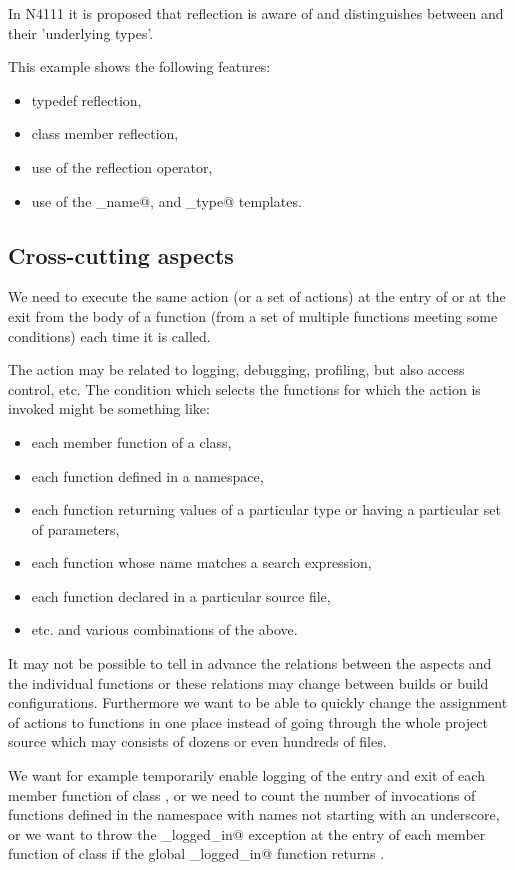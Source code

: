 In N4111 it is proposed that reflection is aware of \verb@typedef@s and distinguishes between
\verb@typedef@s and their 'underlying types'.

This example shows the following features:

\begin{itemize}
\item{typedef reflection,}
\item{class member reflection,}
\item{use of the reflection operator,}
\item{use of the \verb@base_name@, \verb@type@ and \verb@original_type@ templates. }
\end{itemize}

\subsection{Cross-cutting aspects}

We need to execute the same action (or a set of actions) at the entry of or at the exit from the body of
a function (from a set of multiple functions meeting some conditions) each time it is called.

The action may be related to logging, debugging, profiling, but also access control, etc.
The condition which selects the functions for which the action is invoked might be something like:
\begin{itemize}
\item each member function of a class,
\item each function defined in a namespace,
\item each function returning values of a particular type or having a particular set of parameters,
\item each function whose name matches a search expression,
\item each function declared in a particular source file,
\item etc. and various combinations of the above.
\end{itemize}

It may not be possible to tell in advance the relations between the aspects and the individual functions
or these relations may change between builds or build configurations.
Furthermore we want to be able to quickly change the assignment of actions to functions in one
place instead of going through the whole project source which may consists of dozens or even hundreds of files.

We want for example temporarily enable logging of the entry and exit of each member function of class \verb@foo@,
or we need to count the number of invocations of functions defined in the \verb@bar@ namespace with
names not starting with an underscore, or we want to throw the \verb@not_logged_in@ exception at the entry
of each member function of class \verb@secure@ if the global \verb@user_logged_in@ function returns \verb@false@.

